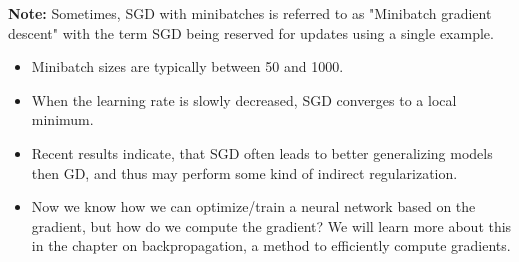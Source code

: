 \begin{vbframe}
\textbf{Note:} Sometimes, SGD with minibatches is referred to as "Minibatch gradient descent" with the term SGD being reserved for updates using a single example.

\framebreak 


\vspace*{0.5cm}
  \begin{itemize}
    \item Minibatch sizes are typically between 50 and 1000.
    \item When the learning rate is slowly decreased, SGD converges to a local minimum.
    \item Recent results indicate, that SGD often leads to better generalizing models then GD, and thus may perform some kind of indirect regularization.
    \item Now we know how we can optimize/train a neural network based on the gradient, but how do we compute the gradient? We will learn more about this in the chapter on backpropagation, a method to efficiently compute gradients.
  \end{itemize}
\end{vbframe}


\endlecture
